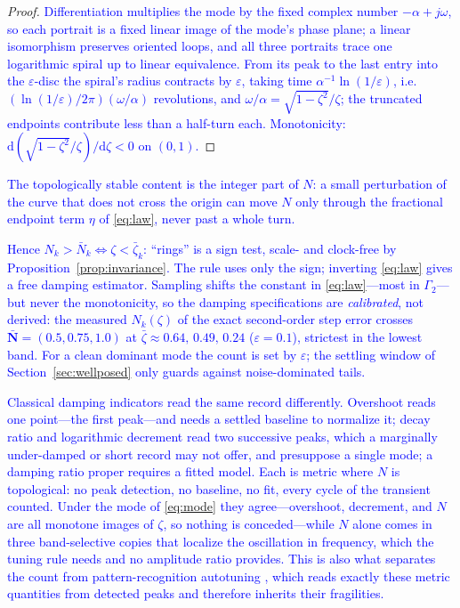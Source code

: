 \documentclass[final,3p,times,twocolumn]{elsarticle}
\newcommand{\revb}[1]{\textcolor{blue}{#1}} %
\newcommand{\revd}[1]{\textcolor{blue}{#1}} %
\newcommand{\revg}[1]{\textcolor{blue}{#1}} %
\newcommand{\revh}[1]{\textcolor{blue}{#1}} %
\begin{document}
\begin{proof}
\revb{Differentiation multiplies the mode by the fixed complex number
$-\alpha+j\omega$, so each portrait is a fixed linear image of the
mode's phase plane; a linear isomorphism preserves oriented loops, and
all three portraits trace one logarithmic spiral up to linear
equivalence. From its peak to the last entry into the
$\varepsilon$-disc the spiral's radius contracts by $\varepsilon$,
taking time $\alpha^{-1}\ln(1/\varepsilon)$, i.e.\
$(\ln(1/\varepsilon)/2\pi)(\omega/\alpha)$ revolutions, and
$\omega/\alpha=\sqrt{1-\zeta^2}/\zeta$; the truncated endpoints
contribute less than a half-turn each. Monotonicity:
$\mathrm d(\sqrt{1-\zeta^2}/\zeta)/\mathrm d\zeta<0$ on
$(0,1)$.}
\end{proof}

\revg{The topologically stable content is the integer part of $N$: a
\revh{small} perturbation of the curve that does not cross the origin can move $N$
only through the fractional endpoint term $\eta$ of \eqref{eq:law},
never past a whole turn.}

\revd{Hence $N_k>\bar N_k \iff \zeta<\bar\zeta_k$: ``rings'' is a
sign test, scale- and clock-free by
Proposition~\ref{prop:invariance}. The rule uses only the sign;
inverting \eqref{eq:law} gives a free damping estimator. Sampling
shifts the constant in \eqref{eq:law}---most in $\Gamma_2$---but never
the monotonicity, so the damping specifications are
\emph{calibrated}, not derived: the measured $N_k(\zeta)$ of the exact
second-order step error crosses $\bar{\mathbf N}=(0.5,0.75,1.0)$ at
$\bar\zeta \approx 0.64,\,0.49,\,0.24$ ($\varepsilon=0.1$), strictest
in the lowest band. For a clean dominant mode the count is set by
$\varepsilon$; the settling window of Section~\ref{sec:wellposed} only
guards against noise-dominated tails.}

\revg{Classical damping indicators read the same record differently.
Overshoot reads one point---the first peak---and needs a settled
baseline to normalize it; decay ratio and logarithmic decrement read
two successive peaks, which a marginally under-damped or short record
may not offer, and presuppose a single mode; a damping ratio proper
requires a fitted model. Each is metric where $N$ is topological: no
peak detection, no baseline, no fit, every cycle of the transient
counted. Under the mode of \eqref{eq:mode} they agree---overshoot,
decrement, and $N$ are all monotone images of $\zeta$, so nothing is
conceded---while $N$ alone comes in three band-selective copies that
localize the oscillation in frequency, which the tuning rule needs and
no amplitude ratio provides. \revh{This is also what separates the
count from pattern-recognition autotuning \cite{KrausMyron1984}, which
reads exactly these metric quantities from detected peaks and
therefore inherits their fragilities.}}
\end{document}
